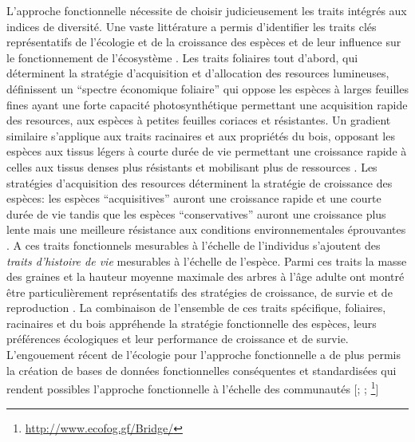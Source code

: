 \documentclass[
  11pt,
  french,
  A4paper,
  extrafontsizes,onecolumn,openright
  ]{memoir}
\begin{document}
L'approche fonctionnelle nécessite de choisir judicieusement les traits
intégrés aux indices de diversité. Une vaste littérature a permis
d'identifier les traits clés représentatifs de l'écologie et de la
croissance des espèces et de leur influence sur le fonctionnement de
l'écosystème \autocite{Reich2014}. Les traits foliaires tout d'abord,
qui déterminent la stratégie d'acquisition et d'allocation des resources
lumineuses, définissent un ``spectre économique foliaire'' qui oppose
les espèces à larges feuilles fines ayant une forte capacité
photosynthétique permettant une acquisition rapide des resources, aux
espèces à petites feuilles coriaces et résistantes. Un gradient
similaire s'applique aux traits racinaires et aux propriétés du bois,
opposant les espèces aux tissus légers à courte durée de vie permettant
une croissance rapide à celles aux tissus denses plus résistants et
mobilisant plus de ressources
\autocites{Chave2009}{Valverde-Barrantes2017}. Les stratégies
d'acquisition des resources déterminent la stratégie de croissance des
espèces: les espèces ``acquisitives'' auront une croissance rapide et
une courte durée de vie tandis que les espèces ``conservatives'' auront
une croissance plus lente mais une meilleure résistance aux conditions
environnementales éprouvantes \autocites{Reich1997}{Wright2004}. A ces
traits fonctionnels mesurables à l'échelle de l'individus s'ajoutent des
\emph{traits d'histoire de vie} mesurables à l'échelle de l'espèce.
Parmi ces traits la masse des graines et la hauteur moyenne maximale des
arbres à l'âge adulte ont montré être particulièrement représentatifs
des stratégies de croissance, de survie et de reproduction
\autocites{Westoby1998}{Herault2011}. La combinaison de l'ensemble de
ces traits spécifique, foliaires, racinaires et du bois appréhende la
stratégie fonctionnelle des espèces, leurs préférences écologiques et
leur performance de croissance et de survie. L'engouement récent de
l'écologie pour l'approche fonctionnelle a de plus permis la création de
bases de données fonctionnelles conséquentes et standardisées qui
rendent possibles l'approche fonctionnelle à l'échelle des communautés
{[}\textcite{Kattge2011}; \textcite{Perez-Harguindeguy2013}; \footnote{\url{http://www.ecofog.gf/Bridge/}}{]}
\end{document}
